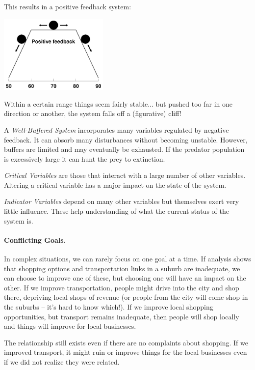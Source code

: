 This results in a positive feedback system:

\begin{center}
	\includegraphics[width=0.4\textwidth]{images/positivefeedback.png}
\end{center}

Within a certain range things seem fairly stable... but pushed too far in one direction or another, the system falls off a (figurative) cliff!


A \textit{Well-Buffered System} incorporates many variables regulated by negative feedback. It can absorb many disturbances without becoming unstable. However, buffers are limited and may eventually be exhausted. If the predator population is excessively large it can hunt the prey to extinction.

\textit{Critical Variables} are those that interact with a large number of other variables. Altering a critical variable has a major impact on the state of the system.

\textit{Indicator Variables} depend on many other variables but themselves exert very little influence. These help understanding of what the current status of the system is. 

\paragraph{Conflicting Goals.}
In complex situations, we can rarely focus on one goal at a time. If analysis shows that shopping options and transportation links in a suburb are inadequate, we can choose to improve one of these, but choosing one will have an impact on the other. If we improve transportation, people might drive into the city and shop there, depriving local shops of revenue (or people from the city will come shop in the suburbs -- it's hard to know which!). If we improve local shopping opportunities, but transport remains inadequate, then people will shop locally and things will improve for local businesses. 

The relationship still exists even if there are no complaints about shopping. If we improved transport, it might ruin or improve things for the local businesses even if we did not realize they were related.

